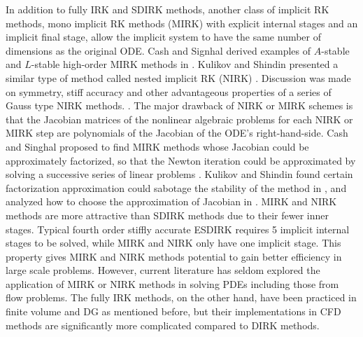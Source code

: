 In addition to fully IRK and SDIRK methods,
another class of implicit RK methods,
mono implicit RK methods (MIRK)
\cite{cash1975classMIRKOrig}
with explicit internal stages and
an implicit final stage,
allow the implicit system to
have the same number of dimensions
as the original ODE.
Cash and Signhal derived examples of
$A$-stable and $L$-stable high-order
MIRK methods in
\cite{cash1977clasMIRK1,cash1982monoMIRK2}.
Kulikov and Shindin presented a similar type
of method called nested implicit RK (NIRK)
\cite{kulikov2006familyNIRKOrig}.
Discussion was made on symmetry, stiff accuracy and
other advantageous properties of a series of Gauss type
NIRK methods.
\cite{kulikov2009adaptive}.
The major drawback of NIRK or MIRK schemes is that
the Jacobian matrices of the nonlinear algebraic problems
for each NIRK or MIRK step are
polynomials of the Jacobian of the ODE's right-hand-side.
Cash and Singhal proposed to find MIRK methods whose
Jacobian could be approximately factorized,
so that the Newton iteration
could be approximated by solving a successive series of linear
problems \cite{cash1982monoMIRK2}.
Kulikov and Shindin found certain factorization
approximation could sabotage the stability of
the method in
\cite{kulikov2009adaptive},
and analyzed how to choose the approximation of
Jacobian in
\cite{kulikov2007asymptotic}.
MIRK and NIRK methods are more attractive than SDIRK methods
due to their fewer inner stages.
Typical fourth order
stiffly accurate ESDIRK requires 5 implicit internal stages to be
solved,
while MIRK and NIRK only have one implicit stage.
This property gives MIRK and NIRK methods potential to gain better efficiency in
large scale problems.
However, current literature has seldom explored
the application of MIRK or NIRK methods in
solving PDEs including those from flow problems.
The fully IRK methods, on the other hand,
have been practiced in
finite volume \cite{jameson2017evaluation} and
DG \cite{pazner2017stage}
as mentioned before,
but their implementations
in CFD methods are significantly more
complicated compared to DIRK methods.


